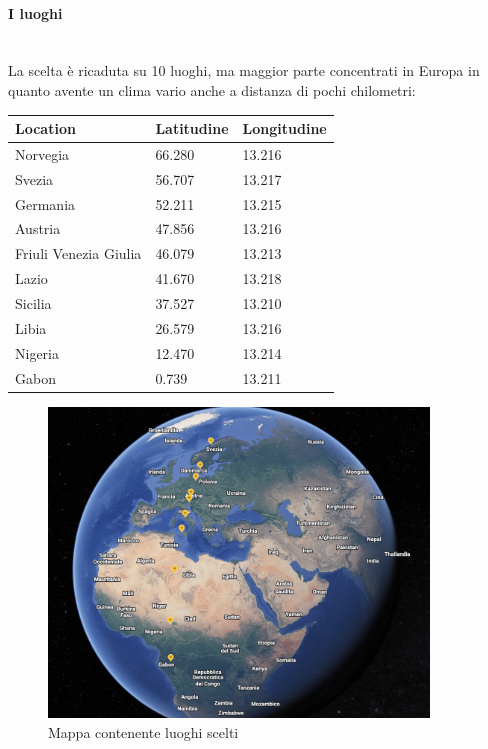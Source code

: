 \paragraph{I luoghi}\mbox{}\\
La scelta è ricaduta su 10 luoghi, ma maggior parte concentrati in Europa in quanto avente un clima vario anche a distanza di pochi chilometri:
\begin{table}[ht]
    \centering
    \begin{tabular}{|lll|}
    \hline
        \textbf{Location} & \textbf{Latitudine} & \textbf{Longitudine} \\ \hline
        Norvegia & 66.280 & 13.216 \\ \hline
        Svezia & 56.707 & 13.217 \\ \hline
        Germania & 52.211 & 13.215 \\ \hline
        Austria & 47.856 & 13.216 \\ \hline
        Friuli Venezia Giulia & 46.079 & 13.213 \\ \hline
        Lazio & 41.670 & 13.218 \\ \hline
        Sicilia & 37.527 & 13.210 \\ \hline
        Libia & 26.579 & 13.216 \\ \hline
        Nigeria & 12.470 & 13.214 \\ \hline
        Gabon & 0.739 & 13.211 \\ \hline
    \end{tabular}
    \label{tab:coordinate}
\end{table}
\begin{figure}[H]
    \centering
    \includegraphics[width=0.9\textwidth]{res/cap 5/map.png}
    \caption{Mappa contenente luoghi scelti}
    \label{img:Mappa luoghi}
\end{figure}\noindent
